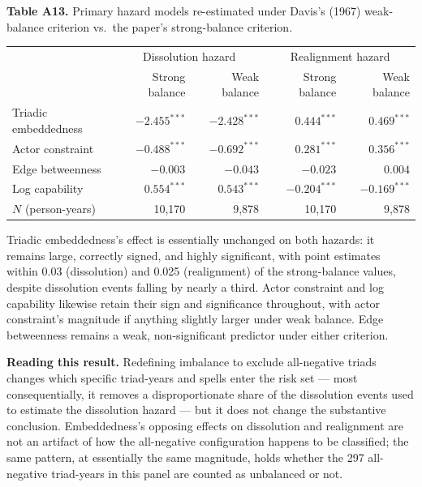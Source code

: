 \documentclass[Afour,sageh,times,doublespace]{sagej}
\begin{document}
\begin{table}[t]
\centering
\textbf{Table A13.} Primary hazard models re-estimated under Davis's (1967) weak-balance criterion vs.\ the paper's strong-balance criterion.

\vspace{4pt}
{\small\sf
\begin{tabular}{lrrrr}
\toprule
 & \multicolumn{2}{c}{Dissolution hazard} & \multicolumn{2}{c}{Realignment hazard} \\
 & Strong balance & Weak balance & Strong balance & Weak balance \\
\midrule
Triadic embeddedness & $-2.455^{***}$ & $-2.428^{***}$ & $0.444^{***}$ & $0.469^{***}$ \\
Actor constraint & $-0.488^{***}$ & $-0.692^{***}$ & $0.281^{***}$ & $0.356^{***}$ \\
Edge betweenness & $-0.003$ & $-0.043$ & $-0.023$ & $0.004$ \\
Log capability & $0.554^{***}$ & $0.543^{***}$ & $-0.204^{***}$ & $-0.169^{***}$ \\
\midrule
$N$ (person-years) & 10,170 & 9,878 & 10,170 & 9,878 \\
\bottomrule
\end{tabular}
\par}
\vspace{4pt}
\end{table}

Triadic embeddedness's effect is essentially unchanged on both hazards: it remains large, correctly signed, and highly significant, with point estimates within 0.03 (dissolution) and 0.025 (realignment) of the strong-balance values, despite dissolution events falling by nearly a third. Actor constraint and log capability likewise retain their sign and significance throughout, with actor constraint's magnitude if anything slightly larger under weak balance. Edge betweenness remains a weak, non-significant predictor under either criterion.

\textbf{Reading this result.} Redefining imbalance to exclude all-negative triads changes which specific triad-years and spells enter the risk set --- most consequentially, it removes a disproportionate share of the dissolution events used to estimate the dissolution hazard --- but it does not change the substantive conclusion. Embeddedness's opposing effects on dissolution and realignment are not an artifact of how the all-negative configuration happens to be classified; the same pattern, at essentially the same magnitude, holds whether the 297 all-negative triad-years in this panel are counted as unbalanced or not.
\end{document}
